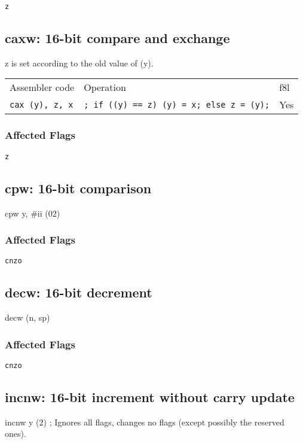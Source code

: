 \documentclass{book}
\begin{document}
\texttt{z}


\subsection{caxw: 16-bit compare and exchange}

z is set according to the old value of (y).

\begin{tabular}{l l l}
Assembler code            & Operation                                     & f8l \\
\texttt{cax (y), z, x}  & \texttt{; if ((y) == z) (y) = x; else z = (y);} & Yes \\

\end{tabular}

\subsubsection*{Affected Flags}

\texttt{z}


\subsection{cpw: 16-bit comparison}

cpw y, \#ii (02)

\subsubsection*{Affected Flags}

\texttt{cnzo}


\subsection{decw: 16-bit decrement}

decw (n, sp)

\subsubsection*{Affected Flags}

\texttt{cnzo}


\subsection{incnw: 16-bit increment without carry update}

incnw y (2)            ; Ignores all flags, changes no flags (except possibly the reserved ones).
\end{document}
